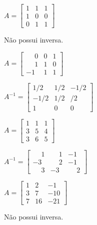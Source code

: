 \documentclass[12pt]{exam}
\begin{document}
\begin{exercicio}
    $
    A = \begin{bmatrix}
        1 & 1 & 1\\
        1 & 0 & 0\\
        0 & 1 & 1
    \end{bmatrix}
    $
    \begin{solucao}
        Não possui inversa.
    \end{solucao}
\end{exercicio}

\begin{exercicio}
    $
    A = \begin{bmatrix}
        \phantom{-}0 & 0 & 1\\
        \phantom{-}1 & 1 & 0\\
        -1 & 1 & 1
    \end{bmatrix}
    $
    \begin{solucao}
        $
            A^{-1} = \begin{bmatrix}
                1/2 & 1/2 & -1/2\\
                -1/2 & 1/2 & /2\\
                1 & 0 & 0
            \end{bmatrix}
        $
    \end{solucao}
\end{exercicio}


\begin{exercicio}
  $
    A =\begin{bmatrix}
        1 & 1 & 1\\
        3 & 5 & 4\\
        3 & 6 & 5
      \end{bmatrix}
    $
  \begin{solucao}
    $
      A^{-1} =\begin{bmatrix}
        \phantom{-} 1 & \phantom{-} 1 & -1\\
        -3 & \phantom{-} 2 & -1\\
        \phantom{-} 3 & -3 & \phantom{-} 2
      \end{bmatrix}
    $
  \end{solucao}
\end{exercicio}

\begin{exercicio}
  $
    A =\begin{bmatrix}
        1 & 2 & -1\\
        3 & 7 & -10\\
        7 & 16 & -21
    \end{bmatrix}
  $
  \begin{solucao}
    Não possui inversa.
  \end{solucao}
\end{exercicio}
\end{document}
